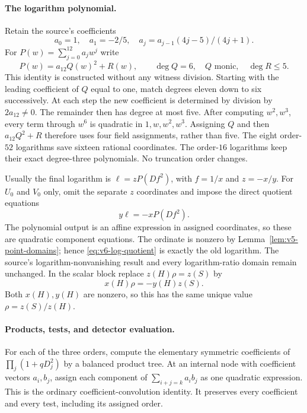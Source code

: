 \documentclass[11pt]{article}
\theoremstyle{definition}
\theoremstyle{remark}
\begin{document}
\paragraph{The logarithm polynomial.}
Retain the source's coefficients
\[
 a_0=1,\quad a_1=-2/5,\quad
 a_j=a_{j-1}(4j-5)/(4j+1).
\]
For $P(w)=\sum_{j=0}^{12}a_jw^j$ write
\begin{equation}\label{eq:v6-log-square-completion}
 P(w)=a_{12}Q(w)^2+R(w),\qquad
 \deg Q=6,\quad Q\text{ monic},\quad\deg R\le5.
\end{equation}
This identity is constructed without any witness division. Starting
with the leading coefficient of $Q$ equal to one, match degrees eleven
down to six successively. At each step the new coefficient is determined
by division by $2a_{12}\ne0$. The remainder then has degree at most five.
After computing $w^2,w^3$, every term through $w^6$ is quadratic in
$1,w,w^2,w^3$. Assigning $Q$ and then $a_{12}Q^2+R$ therefore uses
four field assignments, rather than five. The eight order-$52$
logarithms save sixteen rational coordinates. The order-$16$ logarithms
keep their exact degree-three polynomials. No truncation order changes.

Usually the final logarithm is $\ell=zP(Df^2)$, with
$f=1/x$ and $z=-x/y$. For $U_0$ and $V_0$ only, omit the separate $z$
coordinates and impose the direct quotient equations
\begin{equation}\label{eq:v6-log-quotient}
 y\ell=-xP(Df^2).
\end{equation}
The polynomial output is an affine expression in assigned coordinates,
so these are quadratic component equations. The ordinate is nonzero by
Lemma~\ref{lem:v5-point-domains}; hence \eqref{eq:v6-log-quotient}
is exactly the old logarithm. The source's logarithm-nonvanishing result
and every logarithm-ratio domain remain unchanged. In the scalar block
replace $z(H)\rho=z(S)$ by
\begin{equation}\label{eq:v6-scalar-ratio}
 x(H)\rho=-y(H)z(S).
\end{equation}
Both $x(H),y(H)$ are nonzero, so this has the same unique value
$\rho=z(S)/z(H)$.

\paragraph{Products, tests, and detector evaluation.}
For each of the three orders, compute the elementary symmetric
coefficients of $\prod_j(1+qD_j^2)$ by a balanced product tree.
At an internal node with coefficient vectors $a_i,b_j$, assign each
component of $\sum_{i+j=k}a_ib_j$ as one quadratic expression.
This is the ordinary coefficient-convolution identity. It preserves
every coefficient and every test, including its assigned order.
\end{document}

